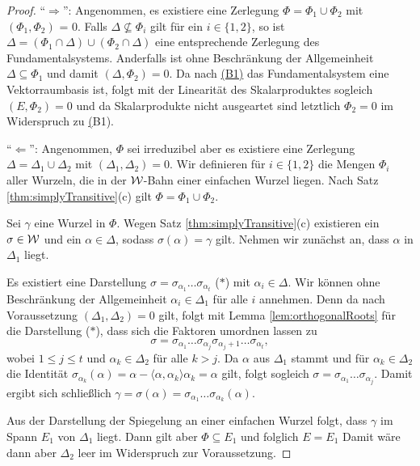 \begin{proof}
  ``$\Rightarrow$'':
  Angenommen, es existiere eine Zerlegung $\Phi = \Phi_1 \cup \Phi_2$ mit $(\Phi_1, \Phi_2)$ = 0.
  Falls $\Delta \not\subseteq \Phi_i$ gilt für ein $i \in \{1,2\}$, so ist $\Delta = (\Phi_1 \cap \Delta) \cup (\Phi_2 \cap \Delta)$ eine entsprechende Zerlegung des Fundamentalsystems.
  Anderfalls ist ohne Beschränkung der Allgemeinheit $\Delta \subseteq \Phi_1$ und damit $(\Delta, \Phi_2) = 0$.
  Da nach \hyperref[it:B1]{(B1)} das Fundamentalsystem eine Vektorraumbasis ist, folgt mit der Linearität des Skalarproduktes sogleich $(E, \Phi_2) = 0$ und da Skalarprodukte nicht ausgeartet sind letztlich $\Phi_2 = {0}$ im Widerspruch zu \hyperref[it:B1](B1).

  ``$\Leftarrow$'':
  Angenommen, $\Phi$ sei irreduzibel aber es existiere eine Zerlegung $\Delta = \Delta_1 \cup \Delta_2$ mit $(\Delta_1, \Delta_2) = 0$.
  Wir definieren für $i \in \{1,2\}$ die Mengen $\Phi_i$ aller Wurzeln, die in der $\mathcal{W}$\hyp{}Bahn einer einfachen Wurzel liegen. 
  Nach Satz \ref{thm:simplyTransitive}(c) gilt $\Phi = \Phi_1 \cup \Phi_2$.

  Sei $\gamma$ eine Wurzel in $\Phi$.
  Wegen Satz \ref{thm:simplyTransitive}(c) existieren ein $\sigma \in \mathcal{W}$ und ein $\alpha \in \Delta$, sodass $\sigma(\alpha) = \gamma$ gilt.
  Nehmen wir zunächst an, dass $\alpha$ in $\Delta_1$ liegt.

  Es existiert eine Darstellung $\sigma = \sigma_{\alpha_1} \dots \sigma_{\alpha_t}$ ($\ast$) mit $\alpha_i \in \Delta$.
  Wir können ohne Beschränkung der Allgemeinheit $\alpha_i \in \Delta_1$ für alle $i$ annehmen.
  Denn da nach Voraussetzung $(\Delta_1, \Delta_2) = 0$ gilt, folgt mit Lemma \ref{lem:orthogonalRoots} für die Darstellung ($\ast$), dass sich die Faktoren umordnen lassen zu
  \begin{displaymath}
    \sigma = \sigma_{\alpha_1} \dots \sigma_{\alpha_j} \sigma_{\alpha_j+1} \dots \sigma_{\alpha_t},
  \end{displaymath}
  wobei $1 \leq j \leq t$ und $\alpha_k \in \Delta_2$ für alle $k > j$.
  Da $\alpha$ aus $\Delta_1$ stammt und für $\alpha_k \in \Delta_2$ die Identität $\sigma_{\alpha_k}(\alpha) = \alpha - \langle \alpha, \alpha_k \rangle \alpha_k = \alpha$ gilt, folgt sogleich $\sigma = \sigma_{\alpha_1} \dots \sigma_{\alpha_j}$. 
  Damit ergibt sich schließlich $\gamma = \sigma(\alpha) = \sigma_{\alpha_1} \dots \sigma_{\alpha_k}(\alpha)$.

  Aus der Darstellung der Spiegelung an einer einfachen Wurzel folgt, dass $\gamma$ im Spann $E_1$ von $\Delta_1$ liegt.
  Dann gilt aber $\Phi \subseteq E_1$ und folglich $E = E_1$
  Damit wäre dann aber $\Delta_2$ leer im Widerspruch zur Voraussetzung.
\end{proof}

